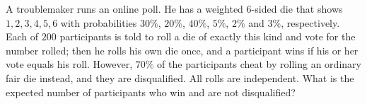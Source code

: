 A troublemaker runs an online poll. He has a weighted $6$-sided die that shows $1,2,3,4,5,6$ with probabilities $30\%$, $20\%$, $40\%$, $5\%$, $2\%$ and $3\%$, respectively. Each of $200$ participants is told to roll a die of exactly this kind and vote for the number rolled; then he rolls his own die once, and a participant wins if his or her vote equals his roll. However, $70\%$ of the participants cheat by rolling an ordinary fair die instead, and they are disqualified. All rolls are independent. What is the expected number of participants who win and are not disqualified?
